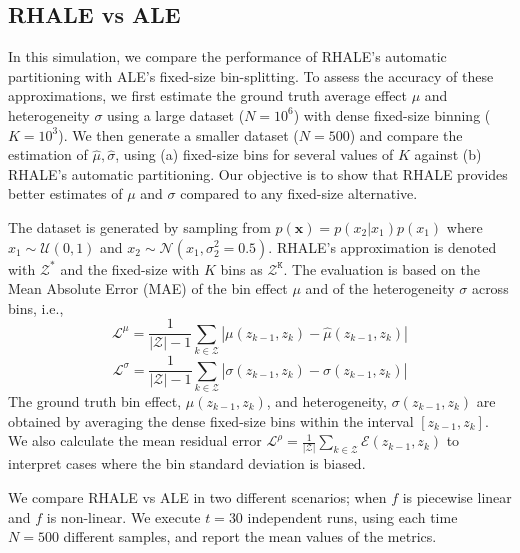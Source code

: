 \documentclass{ecai}  %
\begin{document}
\subsection{RHALE vs ALE}
\label{subsec:simulation-examples-2}

In this simulation, we compare the performance of RHALE's automatic
partitioning with ALE's fixed-size bin-splitting. To assess the
accuracy of these approximations, we first estimate the ground truth
average effect \(\mu\) and heterogeneity \(\sigma\) using a large
dataset (\(N=10^6\)) with dense fixed-size binning (\(K=10^3\)). We
then generate a smaller dataset (\(N=500\)) and compare the estimation
of $\hat{\mu}, \hat{\sigma}$, using (a) fixed-size bins for several
values of \(K\) against (b) RHALE's automatic partitioning. Our
objective is to show that RHALE provides better
estimates of \(\mu\) and \(\sigma\) compared to any fixed-size
alternative.

The dataset is generated by sampling from
\(p(\mathbf{x}) = p(x_2|x_1)p(x_1)\) where
\(x_1 \sim \mathcal{U}(0,1)\) and
\(x_2 \sim \mathcal{N}(x_1, \sigma_2^2=0.5)\).  RHALE's approximation
is denoted with \(\mathcal{Z^*}\) and the fixed-size with \(K\) bins
as \(\mathcal{Z^{\mathtt{K}}}\). The evaluation is based on the Mean
Absolute Error (MAE) of the bin effect \(\mu\) and of the
heterogeneity \(\sigma\) across bins, i.e.,
%
\begin{equation}
  \label{eq:eval_met_1}
  \mathcal{L}^{\mu} = \frac{1}{|\mathcal{Z}| - 1} \sum_{k \in
  \mathcal{Z}} | \mu(z_{k-1}, z_k) - \hat{\mu}(z_{k-1}, z_k) |
\end{equation}
%
\begin{equation}
  \label{eq:eval_met_2}
  \mathcal{L}^{\sigma} = \frac{1}{|\mathcal{Z}| -1} \sum_{k \in
    \mathcal{Z}} | \sigma(z_{k-1}, z_k) - \hat{\sigma}(z_{k-1}, z_k) |
\end{equation}
%
The ground truth bin effect, \(\mu(z_{k-1}, z_k)\), and heterogeneity,
\(\sigma(z_{k-1}, z_k)\) are obtained by averaging the dense
fixed-size bins within the interval \([z_{k-1}, z_k]\).
We also calculate the mean residual error
\(\mathcal{L}^{\rho} = \frac{1}{|\mathcal{Z}|} \sum_{k \in
  \mathcal{Z}} \mathcal{E}(z_{k-1}, z_k) \) to interpret cases
where the bin standard deviation is biased.

We compare RHALE vs ALE in two different scenarios; when
\(f\) is piecewise linear and \(f\) is non-linear. We
execute \(t = 30\) independent runs, using each time \(N=500\)
different samples, and report the mean values of the metrics.
\end{document}
